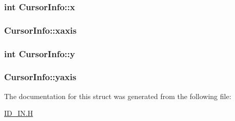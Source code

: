 \hypertarget{structCursorInfo_af8d06085a2a89d8bd08d98372478285b}{
\subsubsection[{x}]{\setlength{\rightskip}{0pt plus 5cm}int {\bf CursorInfo::x}}}
\label{structCursorInfo_af8d06085a2a89d8bd08d98372478285b}
\hypertarget{structCursorInfo_a9e7b5228ce18aa4b85fab9c917eb7395}{
\subsubsection[{xaxis}]{ {\bf CursorInfo::xaxis}}}
\label{structCursorInfo_a9e7b5228ce18aa4b85fab9c917eb7395}
\hypertarget{structCursorInfo_a5751ef88d47979695f38ab09c8816a2d}{
\subsubsection[{y}]{\setlength{\rightskip}{0pt plus 5cm}int {\bf CursorInfo::y}}}
\label{structCursorInfo_a5751ef88d47979695f38ab09c8816a2d}
\hypertarget{structCursorInfo_a588feac2695a14f7448c7bdcae200ba5}{
\subsubsection[{yaxis}]{ {\bf CursorInfo::yaxis}}}
\label{structCursorInfo_a588feac2695a14f7448c7bdcae200ba5}


The documentation for this struct was generated from the following file:\begin{DoxyCompactItemize}
\item 
\hyperlink{ID__IN_8H}{ID\_\-IN.H}\end{DoxyCompactItemize}
